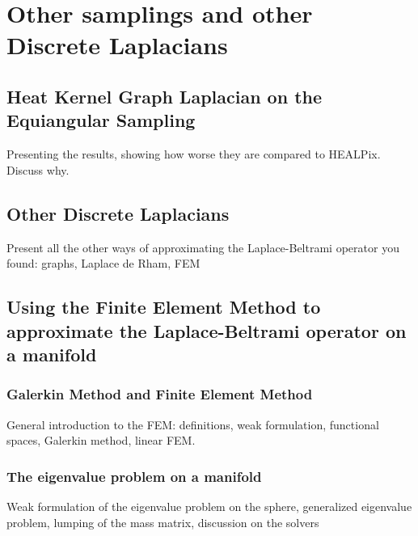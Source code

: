

\section{Other samplings and other Discrete Laplacians}

\subsection{Heat Kernel Graph Laplacian on the Equiangular Sampling}
Presenting the results, showing how worse they are compared to HEALPix. Discuss why.
\subsection{Other Discrete Laplacians}
Present all the other ways of approximating the Laplace-Beltrami operator you found: graphs, Laplace de Rham, FEM
\subsection{Using the Finite Element Method to approximate the Laplace-Beltrami operator on a manifold}
\subsubsection{Galerkin Method and Finite Element Method}
General introduction to the FEM: definitions, weak formulation, functional spaces, Galerkin method, linear FEM.
\subsubsection{The eigenvalue problem on a manifold}
Weak formulation of the eigenvalue problem on the sphere, generalized eigenvalue problem, lumping of the mass matrix, discussion on the solvers
